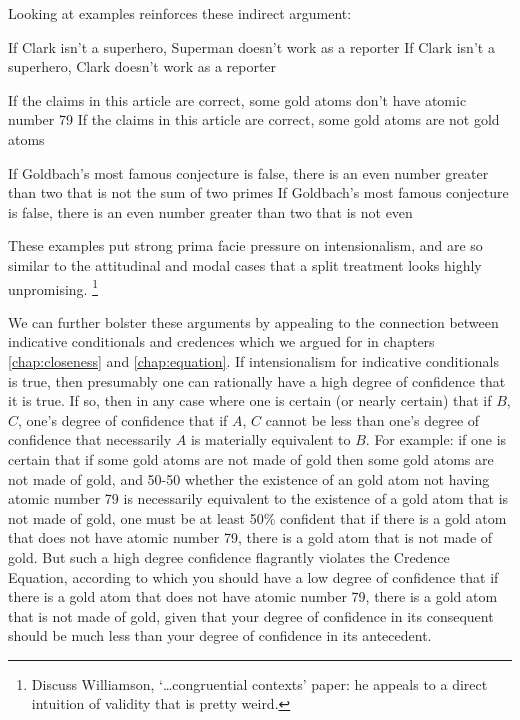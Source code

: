 \documentclass[If.tex]{subfiles}
\begin{document}
Looking at examples reinforces these indirect argument:
\begin{prop}
	\nitem \label{supermanmight}
	\begin{prop}
		\aitem
		If Clark isn't a superhero, Superman doesn't work as a reporter
		\aitem
		If Clark isn't a superhero, Clark doesn't work as a reporter
	\end{prop}
	\nitem
	\begin{prop}
		\aitem
		If the claims in this article are correct, some gold atoms don't have atomic number 79
		\aitem
		If the claims in this article are correct, some gold atoms are not gold atoms
	\end{prop}
	\nitem
	\begin{prop}
		\aitem
		If Goldbach's most famous conjecture is false, there is an even number greater than two that is not the sum of two primes
		\aitem
		If Goldbach's most famous conjecture is false, there is an even number greater than two that is not even
	\end{prop}
\end{prop}
These examples put strong prima facie pressure on intensionalism, and are so similar to the attitudinal and modal cases that a split treatment looks highly unpromising.%
\footnote{Discuss Williamson, ‘…congruential contexts’ paper: he appeals to a direct intuition of validity that is pretty weird.}

We can further bolster these arguments by appealing to the connection between indicative conditionals and credences which we argued for in chapters \ref{chap:closeness} and \ref{chap:equation}.  If intensionalism for indicative conditionals is true, then presumably one can rationally have a high degree of confidence that it is true.  If so, then in any case where one is certain (or nearly certain) that if $B$, $C$, one's degree of confidence that if $A$, $C$ cannot be less than one's degree of confidence that necessarily $A$ is materially equivalent to $B$.  For example: if one is certain that if some gold atoms are not made of gold then some gold atoms are not made of gold, and 50-50 whether the existence of an gold atom not having atomic number 79 is necessarily equivalent to the existence of a gold atom that is not made of gold, one must be at least 50$\%$ confident that if there is a gold atom that does not have atomic number 79, there is a gold atom that is not made of gold. But such a high degree confidence flagrantly violates the Credence Equation, according to which you should have a low degree of confidence that if there is a gold atom that does not have atomic number 79, there is a gold atom that is not made of gold, given that your degree of confidence in its consequent should be much less than your degree of confidence in its antecedent.  
\end{document}
